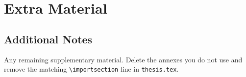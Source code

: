 
\chapter{Extra Material}
\label{app:extra}

\section{Additional Notes}

Any remaining supplementary material. Delete the annexes you do not use
and remove the matching \verb|\importsection| line in \texttt{thesis.tex}.
